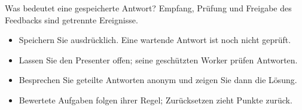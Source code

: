 \begin{frame}[t]{Was bedeutet eine gespeicherte Antwort?}
Empfang, Prüfung und Freigabe des Feedbacks sind getrennte Ereignisse.
\medskip
\begin{itemize}
\item Speichern Sie ausdrücklich. Eine wartende Antwort ist noch nicht geprüft.
\item Lassen Sie den Presenter offen; seine geschützten Worker prüfen Antworten.
\item Besprechen Sie geteilte Antworten anonym und zeigen Sie dann die Lösung.
\item Bewertete Aufgaben folgen ihrer Regel; Zurücksetzen zieht Punkte zurück.
\end{itemize}
\end{frame}

